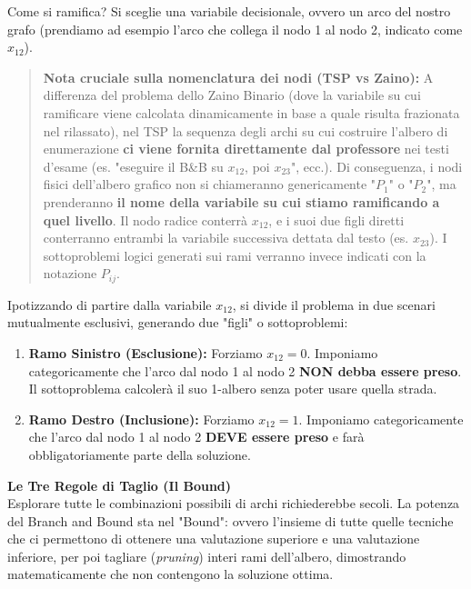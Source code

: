 \documentclass[12pt, a4paper]{article}
\begin{document}
	Come si ramifica? Si sceglie una variabile decisionale, ovvero un arco del nostro grafo (prendiamo ad esempio l'arco che collega il nodo 1 al nodo 2, indicato come $x_{12}$). 
	
	\begin{quote}
		\textbf{Nota cruciale sulla nomenclatura dei nodi (TSP vs Zaino):}
		A differenza del problema dello Zaino Binario (dove la variabile su cui ramificare viene calcolata dinamicamente in base a quale risulta frazionata nel rilassato), nel TSP la sequenza degli archi su cui costruire l'albero di enumerazione \textbf{ci viene fornita direttamente dal professore} nei testi d'esame (es. "eseguire il B\&B su $x_{12}$, poi $x_{23}$", ecc.). 
		Di conseguenza, i nodi fisici dell'albero grafico non si chiameranno genericamente "$P_1$" o "$P_2$", ma prenderanno \textbf{il nome della variabile su cui stiamo ramificando a quel livello}. Il nodo radice conterrà $x_{12}$, e i suoi due figli diretti conterranno entrambi la variabile successiva dettata dal testo (es. $x_{23}$). I sottoproblemi logici generati sui rami verranno invece indicati con la notazione $P_{ij}$.
	\end{quote}
	
	Ipotizzando di partire dalla variabile $x_{12}$, si divide il problema in due scenari mutualmente esclusivi, generando due "figli" o sottoproblemi:
	\begin{enumerate}
		\item \textbf{Ramo Sinistro (Esclusione):} Forziamo $x_{12} = 0$. Imponiamo categoricamente che l'arco dal nodo 1 al nodo 2 \textbf{NON debba essere preso}. Il sottoproblema calcolerà il suo 1-albero senza poter usare quella strada.
		\item \textbf{Ramo Destro (Inclusione):} Forziamo $x_{12} = 1$. Imponiamo categoricamente che l'arco dal nodo 1 al nodo 2 \textbf{DEVE essere preso} e farà obbligatoriamente parte della soluzione.
	\end{enumerate}
	
	\vspace{0.4cm}
	\textbf{Le Tre Regole di Taglio (Il Bound)}\\
	Esplorare tutte le combinazioni possibili di archi richiederebbe secoli. La potenza del Branch and Bound sta nel "Bound": ovvero l'insieme di tutte quelle tecniche che ci permettono di ottenere una valutazione superiore e una valutazione inferiore, per poi tagliare (\textit{pruning}) interi rami dell'albero, dimostrando matematicamente che non contengono la soluzione ottima. 
	
\end{document}
